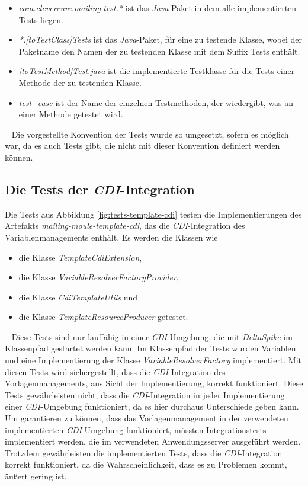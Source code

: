 \begin{itemize}
	\item\emph{com.clevercure.mailing.test.*} 
	\newline
	ist das \emph{Java}-Paket in dem alle implementierten Tests liegen. 
	\item\emph{*.[toTestClass]Tests}
	\newline
	ist das \emph{Java}-Paket, für eine zu testende Klasse, wobei der Paketname den Namen der zu testenden Klasse mit dem Suffix Tests enthält.
	\item\emph{[toTestMethod]Test.java}
	\newline
	ist die implementierte Testklasse für die Tests einer Methode der zu testenden Klasse.
	\item\emph{test\_case}
	\newline
	ist der Name der einzelnen Testmethoden, der wiedergibt, was an einer Methode getestet wird. 
\end{itemize}
\ \newline
Die vorgestellte Konvention der Tests wurde so umgesetzt, sofern es möglich war, da es auch Tests gibt, die nicht mit dieser Konvention definiert werden können.

\subsection{Die Tests der \emph{CDI}-Integration}
Die Tests aus Abbildung \ref{fig:tests-template-cdi} testen die Implementierungen des Artefakts \emph{mailing-moule-template-cdi}, das die \emph{CDI}-Integration des Variablenmanagements enthält. Es werden die Klassen wie
\begin{itemize}
	\item die Klasse \emph{TemplateCdiExtension},
	\item die Klasse \emph{VariableResolverFactoryProvider},
	\item die Klasse \emph{CdiTemplateUtils} und 
	\item die Klasse \emph{TemplateResourceProducer} getestet.
\end{itemize}
\ \newline
Diese Tests sind nur lauffähig in einer \emph{CDI}-Umgebung, die mit \emph{DeltaSpike} im Klassenpfad gestartet werden kann. Im Klassenpfad der Tests wurden Variablen und eine Implementierung der Klasse \emph{VariableResolverFactory} implementiert. Mit diesen Tests wird sichergestellt, dass die \emph{CDI}-Integration des Vorlagenmanagements, aus Sicht der Implementierung, korrekt funktioniert. Diese Tests gewährleisten nicht, dass die \emph{CDI}-Integration in jeder Implementierung einer \emph{CDI}-Umgebung funktioniert, da es hier durchaus Unterschiede geben kann. Um garantieren zu können, dass das Vorlagenmanagement in der verwendeten implementierten \emph{CDI}-Umgebung funktioniert, müssten Integrationstests implementiert werden, die im verwendeten Anwendungsserver ausgeführt werden. Trotzdem gewährleisten die implementierten Tests, dass die \emph{CDI}-Integration korrekt funktioniert, da die Wahrscheinlichkeit, dass es zu Problemen kommt,  äußert gering ist.
\newpage

